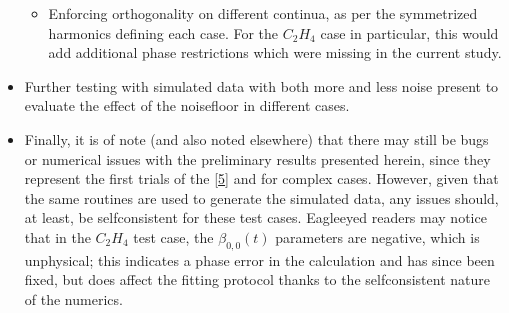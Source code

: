 \documentclass[letterpaper,table,10pt,english]{jupyterBook}
\begin{document}
\begin{itemize}
\begin{itemize}
\item {} 
\sphinxAtStartPar
Enforcing orthogonality on different continua, as per the symmetrized harmonics defining each case. For the \(C_2H_4\) case in particular, this would add additional phase restrictions which were missing in the current study.

\end{itemize}

\item {} 
\sphinxAtStartPar
Further testing with simulated data with both more and less noise present to evaluate the effect of the noise\sphinxhyphen{}floor in different cases.

\item {} 
\sphinxAtStartPar
Finally, it is of note (and also noted elsewhere) that there may still be bugs or numerical issues with the preliminary results presented herein, since they represent the first trials of the  {[}\hyperlink{cite.backmatter/bibliography:id681}{5}{]} and {\hyperref[\detokenize{backmatter/glossary:term-bootstrap-retrieval-protocol}]{}} for complex cases. However, given that the same routines are used to generate the simulated data, any issues should, at least, be self\sphinxhyphen{}consistent for these test cases. Eagle\sphinxhyphen{}eyed readers may notice that in the \(C_2H_4\) test case, the \(\beta_{0,0}(t)\) parameters are negative, which is unphysical; this indicates a phase error in the calculation and has since been fixed, but does  affect the fitting protocol thanks to the self\sphinxhyphen{}consistent nature of the numerics.

\end{itemize}
\end{document}
